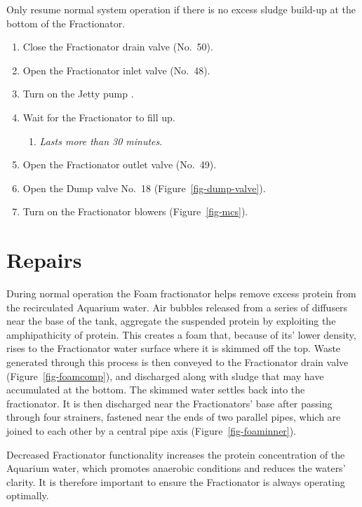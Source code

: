 \documentclass[
  12pt,
]{report}
\providecommand{\tightlist}{%
  \setlength{\itemsep}{0pt}\setlength{\parskip}{0pt}}\usepackage{longtable,booktabs,array}
\begin{document}
{Only resume normal system operation if there is no excess sludge
build-up at the bottom of the Fractionator}.

\begin{enumerate}
\def\labelenumi{\arabic{enumi}.}
\setcounter{enumi}{21}
\tightlist
\item
  Close the Fractionator drain valve (No.~50).
\item
  Open the Fractionator inlet valve (No.~48).
\item
  Turn on the Jetty pump .
\item
  Wait for the Fractionator to fill up.

  \begin{enumerate}
  \def\labelenumii{\roman{enumii})}
  \tightlist
  \item
    \emph{Lasts more than 30 minutes}.
  \end{enumerate}
\item
  Open the Fractionator outlet valve (No.~49).\\
\item
  Open the Dump valve No.~18 (Figure~\ref{fig-dump-valve}).
\item
  Turn on the Fractionator blowers (Figure~\ref{fig-mcs}).
\end{enumerate}

\hypertarget{repairs-1}{%
\section{Repairs}\label{repairs-1}}

During normal operation the Foam fractionator helps remove excess
protein from the recirculated Aquarium water. Air bubbles released from
a series of diffusers near the base of the tank, aggregate the suspended
protein by exploiting the amphipathicity of protein. This creates a foam
that, because of its' lower density, rises to the Fractionator water
surface where it is skimmed off the top. Waste generated through this
process is then conveyed to the Fractionator drain valve
(Figure~\ref{fig-foamcomp}), and discharged along with sludge that may
have accumulated at the bottom. The skimmed water settles back into the
fractionator. It is then discharged near the Fractionators' base after
passing through four strainers, fastened near the ends of two parallel
pipes, which are joined to each other by a central pipe axis
(Figure~\ref{fig-foaminner}).

Decreased Fractionator functionality increases the protein concentration
of the Aquarium water, which promotes anaerobic conditions and reduces
the waters' clarity. It is therefore important to ensure the
Fractionator is always operating optimally.
\end{document}
